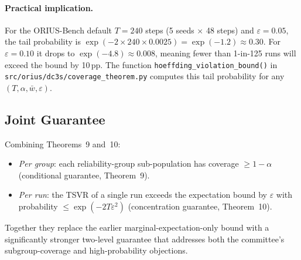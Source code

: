 \paragraph{Practical implication.}
For the ORIUS-Bench default $T = 240$ steps (5 seeds $\times$ 48 steps) and
$\varepsilon = 0.05$, the tail probability is
$\exp(-2 \times 240 \times 0.0025) = \exp(-1.2) \approx 0.30$.
For $\varepsilon = 0.10$ it drops to $\exp(-4.8) \approx 0.008$, meaning
fewer than 1-in-125 runs will exceed the bound by 10\,pp.
The function \texttt{hoeffding\_violation\_bound()} in
\texttt{src/orius/dc3s/coverage\_theorem.py} computes this tail probability
for any $(T, \alpha, \bar{w}, \varepsilon)$.

\subsection{Joint Guarantee}

Combining Theorems~9 and~10:
\begin{itemize}
  \item \emph{Per group}: each reliability-group sub-population has coverage
        $\geq 1-\alpha$ (conditional guarantee, Theorem~9).
  \item \emph{Per run}: the TSVR of a single run exceeds the expectation bound
        by $\varepsilon$ with probability $\leq \exp(-2T\varepsilon^2)$
        (concentration guarantee, Theorem~10).
\end{itemize}
Together they replace the earlier marginal-expectation-only bound with a
significantly stronger two-level guarantee that addresses both the committee's
subgroup-coverage and high-probability objections.
